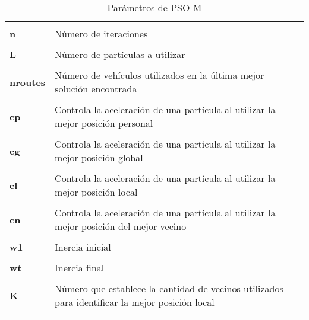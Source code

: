\begin{table}[ht]
\centering
\small
\caption{Parámetros de PSO-M}
\begin{tabular}{l||p{15cm}}
\hline\hline\\
\textbf{n} & Número de iteraciones\\ [0.7ex]\cline{2-2}\\
\textbf{L} & Número de partículas a utilizar\\ [0.7ex]\cline{2-2}\\
\textbf{nroutes} & Número de vehículos utilizados en la última mejor solución encontrada\\ [0.7ex]\cline{2-2}\\
\textbf{cp} & Controla la aceleración de una partícula al utilizar la mejor posición personal\\ [0.7ex]\cline{2-2}\\
\textbf{cg} & Controla la aceleración de una partícula al utilizar la mejor posición global\\ [0.7ex]\cline{2-2}\\
\textbf{cl} & Controla la aceleración de una partícula al utilizar la mejor posición local\\ [0.7ex]\cline{2-2}\\
\textbf{cn} & Controla la aceleración de una partícula al utilizar la mejor posición del mejor vecino\\ [0.7ex]\cline{2-2}\\
\textbf{w1} & Inercia inicial\\ [0.7ex]\cline{2-2}\\
\textbf{wt} & Inercia final\\ [0.7ex]\cline{2-2}\\
\textbf{K} & Número que establece la cantidad de vecinos utilizados para identificar la mejor posición local\\
\\ \hline\hline
\end{tabular}
\label{table:param-pso}
\end{table}
